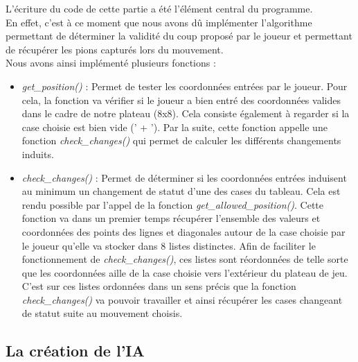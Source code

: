 L'écriture du code de cette partie a été l'élément central du programme.
\\En effet, c'est à ce moment que nous avons dû implémenter l'algorithme permettant de déterminer la validité du coup proposé par le joueur et permettant de récupérer les pions capturés lors du mouvement.
\\Nous avons ainsi implémenté plusieurs fonctions :
\begin{itemize}
	\item \emph{get\_position()} : Permet de tester les coordonnées entrées par le joueur. Pour cela, la fonction va vérifier si le joueur a bien entré des coordonnées valides dans le cadre de notre plateau (8x8). Cela consiste également à regarder si la case choisie est bien vide (' + '). Par la suite, cette fonction appelle une fonction \textit{check\_changes()} qui permet de calculer les différents changements induits.
	\item \emph{check\_changes()} : Permet de déterminer si les coordonnées entrées induisent au minimum un changement de statut d'une des cases du tableau. Cela est rendu possible par l'appel de la fonction \textit{get\_allowed\_position()}. Cette fonction va dans un premier temps récupérer l'ensemble des valeurs et coordonnées des points des lignes et diagonales autour de la case choisie par le joueur qu'elle va stocker dans 8 listes distinctes. Afin de faciliter le fonctionnement de \textit{check\_changes()}, ces listes sont réordonnées de telle sorte que les coordonnées aille de la case choisie vers l'extérieur du plateau de jeu. C'est sur ces listes ordonnées dans un sens précis que la fonction \textit{check\_changes()} va pouvoir travailler et ainsi récupérer les cases changeant de statut suite au mouvement choisis.
\end{itemize}

\subsection{La création de l'IA}

